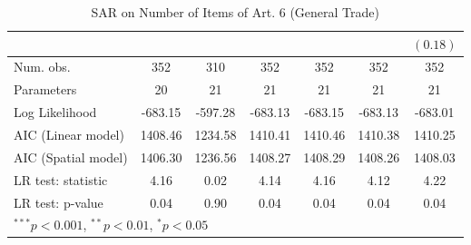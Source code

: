 \begin{table}[!h]
\begin{center}
\begin{tabular}{l c c c c c c }
                        &               &               &               &               &               & $(0.18)$      \\
\midrule
Num. obs.               & 352           & 310           & 352           & 352           & 352           & 352           \\
Parameters              & 20            & 21            & 21            & 21            & 21            & 21            \\
Log Likelihood          & -683.15       & -597.28       & -683.13       & -683.15       & -683.13       & -683.01       \\
AIC (Linear model)      & 1408.46       & 1234.58       & 1410.41       & 1410.46       & 1410.38       & 1410.25       \\
AIC (Spatial model)     & 1406.30       & 1236.56       & 1408.27       & 1408.29       & 1408.26       & 1408.03       \\
LR test: statistic      & 4.16          & 0.02          & 4.14          & 4.16          & 4.12          & 4.22          \\
LR test: p-value        & 0.04          & 0.90          & 0.04          & 0.04          & 0.04          & 0.04          \\
\bottomrule
\multicolumn{7}{l}{\scriptsize{$^{***}p<0.001$, $^{**}p<0.01$, $^*p<0.05$}}
\end{tabular}
\caption{SAR on Number of Items of Art. 6 (General Trade)}
\label{table:coefficients}
\end{center}
\end{table}
